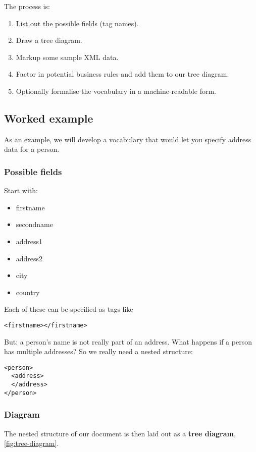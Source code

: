 \documentclass[slides]{pgnotes}
\begin{document}
The process is:

\begin{enumerate}
\item List out the possible fields (tag names).
\item Draw a tree diagram.
\item Markup some sample XML data.
\item Factor in potential business rules and add them to our tree diagram. 
\item Optionally formalise the vocabulary in a machine-readable form.
\end{enumerate}

\subsection{Worked example}

As an example, we will develop a vocabulary that would let you specify address data for a person.

\subsubsection{Possible fields}
Start with:
\begin{itemize}
\item firstname
\item secondname
\item address1
\item address2
\item city
\item country
\end{itemize}

Each of these can be specified as tags like
\begin{verbatim}
<firstname></firstname>
\end{verbatim}

But: a person's name is not really part of an address.
What happens if a person has multiple addresses?
So we really need a nested structure:
\begin{verbatim}
<person>
  <address>
  </address>
</person>
\end{verbatim}


\subsubsection{Diagram}

The nested structure of our document is then laid out as a \textbf{tree diagram}, \autoref{fig:tree-diagram}. 
\end{document}
